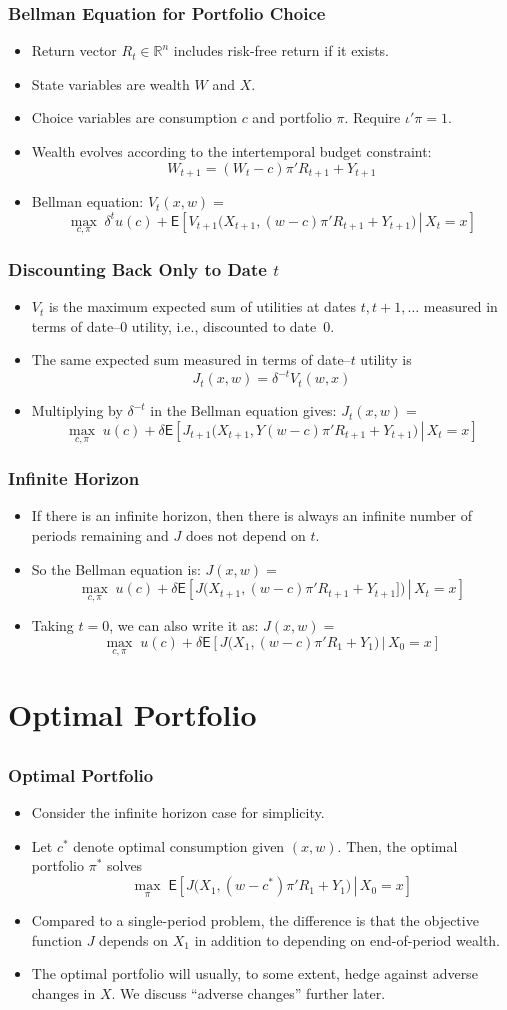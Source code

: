 \documentclass[10pt]{beamer}
\newcommand{\bi}{\begin{itemize}}
\newcommand{\ei}{\end{itemize}}
\newcommand{\im}{\item}
\newcommand{\mye}{\ensuremath{\mathsf{E}}}
\newcommand{\myreal}{\ensuremath{\mathbb{R}}}
\newcommand{\bfr}{\begin{frame}}
\begin{document}
 
\bfr\frametitle{Bellman Equation for Portfolio Choice}
\bi
\im Return vector $R_t \in \myreal^n$ includes risk-free return if it exists.
\im State variables are wealth $W$ and $X$.
\im Choice variables are consumption $c$ and portfolio $\pi$.  Require $\iota'\pi=1$.
\im Wealth evolves according to the intertemporal budget constraint:
$$W_{t+1} = (W_t-c)\pi'R_{t+1} + Y_{t+1}$$
\im Bellman equation: $V_t(x,w) = $
$$ \max_{c,\pi} \; \delta^t u(c) + \mye\left[\left. V_{t+1}\bigg(X_{t+1},(w-c)\pi'R_{t+1} + Y_{t+1}\bigg)\,\right|\, X_t=x\right]$$
\ei
\end{frame}

\bfr\frametitle{Discounting Back Only to Date $t$}
\bi
\im $V_t$ is the maximum expected sum of utilities at dates $t, t+1, \ldots$ measured in terms of date--0 utility, i.e., discounted to date~0.
\im The same expected sum measured in terms of date--$t$ utility is
$$J_t(x,w) = \delta^{-t}V_t(w,x)$$
\im Multiplying by $\delta^{-t}$ in the Bellman equation gives: $J_t(x,w) = $
$$ \max_{c,\pi} \; u(c) + \delta\mye\left[\left.   J_{t+1}\bigg(X_{t+1},Y(w-c)\pi'R_{t+1} + Y_{t+1}\bigg)\,\right|\, X_t=x\right]$$
\ei
\end{frame}

\bfr\frametitle{Infinite Horizon}
\bi
\im If there is an infinite horizon, then there is always an infinite number of periods remaining and $J$ does not depend on $t$.  
\im So the Bellman equation is: $J(x,w) = $
$$ \max_{c,\pi} \; u(c) + \delta\mye\left[\left.  J\bigg(X_{t+1},(w-c)\pi'R_{t+1} + Y_{t+1}]\bigg)\,\right|\, X_t=x\right]$$
\im Taking $t=0$, we can also write it as: $J(x,w) = $
$$ \max_{c,\pi} \; u(c) + \delta\mye\left[\left.  J\bigg(X_{1},(w-c)\pi'R_{1} + Y_1\bigg)\,\right|\, X_0=x\right]$$
\ei
\end{frame}

\section{Optimal Portfolio}
\subsection{}

\bfr\frametitle{Optimal Portfolio}
\bi
\im Consider the infinite horizon case for simplicity.
\im Let $c^*$ denote optimal consumption given $(x,w)$.  Then, the optimal portfolio $\pi^*$ solves
$$\max_\pi \; \mye\left[\left.J\bigg(X_{1},(w-c^*)\pi'R_{1} + Y_1\bigg)\,\right|\, X_0=x\right]$$
\im Compared to a single-period problem, the difference is that the objective function $J$ depends on $X_1$ in addition to depending on end-of-period wealth.
\im The optimal portfolio will usually, to some extent, hedge against adverse changes in $X$.
We discuss ``adverse changes'' further later.
\ei
\end{frame}
\end{document}
